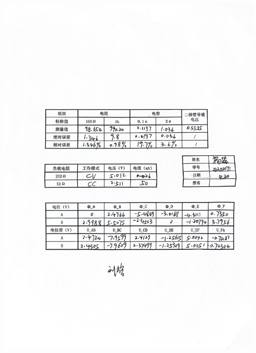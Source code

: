 \documentclass[a4paper]{article}
\begin{document}
\newpage
\begin{center}
    \includegraphics[width=\textwidth]{3}\\
\end{center}
\end{document}
